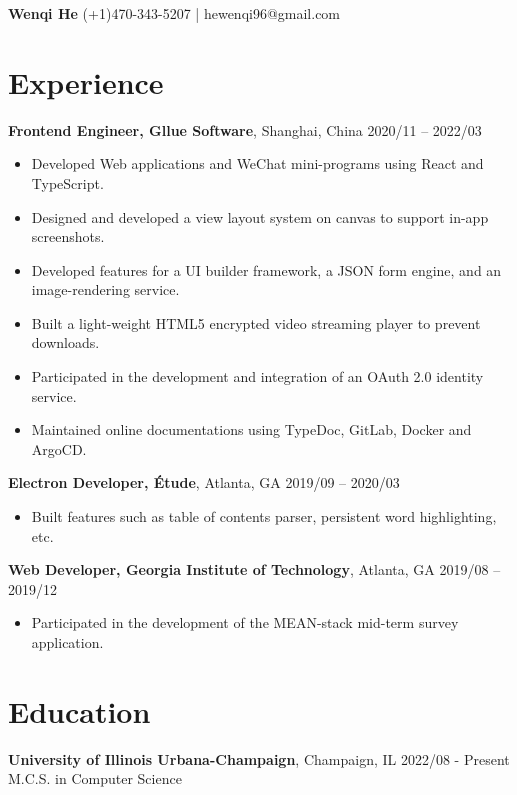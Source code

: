 \documentclass[10pt]{article}
\begin{document}
\setmainfont{CMU Typewriter Text}
{\bf\huge Wenqi He} \hfill (+1)470-343-5207 | hewenqi96@gmail.com

\section*{Experience}
\textbf{Frontend Engineer, Gllue Software}, Shanghai, China \hfill 2020/11 -- 2022/03
\begin{itemize}
\item Developed Web applications and WeChat mini-programs using React and TypeScript.
\item Designed and developed a view layout system on canvas to support in-app screenshots.
\item Developed features for a UI builder framework,  a JSON form engine, and an image-rendering service.
\item Built a light-weight HTML5 encrypted video streaming player to prevent downloads.
\item Participated in the development and integration of an OAuth 2.0 identity service.
\item Maintained online documentations using TypeDoc, GitLab, Docker and ArgoCD.
\end{itemize}

\vspace{0.5em}
\textbf{Electron Developer, Étude}, Atlanta, GA \hfill 2019/09 -- 2020/03
\begin{itemize}
\item Built features such as table of contents parser, persistent word highlighting, etc.
\end{itemize}

\vspace{0.5em}
\textbf{Web Developer, Georgia Institute of Technology}, Atlanta, GA \hfill 2019/08 -- 2019/12
\begin{itemize}
\item Participated in the development of the MEAN-stack mid-term survey application.
\end{itemize}

\section*{Education}

\textbf{University of Illinois Urbana-Champaign}, Champaign, IL \hfill 2022/08 - Present\\
 M.C.S. in Computer Science \\
 
\end{document}
